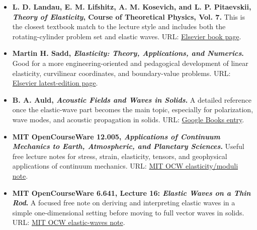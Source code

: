 \documentclass[../main.tex]{subfiles}
\begin{document}
\begin{itemize}
    \item \textbf{L. D. Landau, E. M. Lifshitz, A. M. Kosevich, and L. P. Pitaevskii, \textit{Theory of Elasticity}, Course of Theoretical Physics, Vol. 7.} This is the closest textbook match to the lecture style and includes both the rotating-cylinder problem set and elastic waves. URL: \href{https://shop.elsevier.com/books/theory-of-elasticity/landau/978-0-08-057069-3}{Elsevier book page}.
    \item \textbf{Martin H. Sadd, \textit{Elasticity: Theory, Applications, and Numerics}.} Good for a more engineering-oriented and pedagogical development of linear elasticity, curvilinear coordinates, and boundary-value problems. URL: \href{https://shop.elsevier.com/books/elasticity/sadd/978-0-443-13245-2}{Elsevier latest-edition page}.
    \item \textbf{B. A. Auld, \textit{Acoustic Fields and Waves in Solids}.} A detailed reference once the elastic-wave part becomes the main topic, especially for polarization, wave modes, and acoustic propagation in solids. URL: \href{https://books.google.com/books/about/Acoustic_Fields_and_Waves_in_Solids.html?id=1JMpAQAAMAAJ}{Google Books entry}.
    \item \textbf{MIT OpenCourseWare 12.005, \textit{Applications of Continuum Mechanics to Earth, Atmospheric, and Planetary Sciences}.} Useful free lecture notes for stress, strain, elasticity, tensors, and geophysical applications of continuum mechanics. URL: \href{https://ocw.mit.edu/courses/12-005-applications-of-continuum-mechanics-to-earth-atmospheric-and-planetary-sciences-spring-2006/resources/lec15/}{MIT OCW elasticity/moduli note}.
    \item \textbf{MIT OpenCourseWare 6.641, Lecture 16: \textit{Elastic Waves on a Thin Rod}.} A focused free note on deriving and interpreting elastic waves in a simple one-dimensional setting before moving to full vector waves in solids. URL: \href{https://ocw.mit.edu/courses/6-641-electromagnetic-fields-forces-and-motion-spring-2009/resources/mit6_641s09_lec16/}{MIT OCW elastic-waves note}.
\end{itemize}
\end{document}
